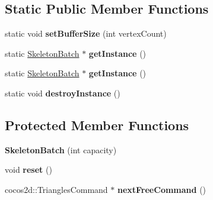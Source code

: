 \subsection*{Static Public Member Functions}
\begin{DoxyCompactItemize}
\item 
\mbox{\label{classspine_1_1SkeletonBatch_abc614238917d7c9c4f26a93323403d04}} 
static void {\bfseries set\+Buffer\+Size} (int vertex\+Count)
\item 
\mbox{\label{classspine_1_1SkeletonBatch_a436fdff286dd0313bbb278ca9eed6dbb}} 
static \hyperlink{classspine_1_1SkeletonBatch}{Skeleton\+Batch} $\ast$ {\bfseries get\+Instance} ()
\item 
\mbox{\label{classspine_1_1SkeletonBatch_af5eb2d714aedbf29cb65a82fabf2619d}} 
static \hyperlink{classspine_1_1SkeletonBatch}{Skeleton\+Batch} $\ast$ {\bfseries get\+Instance} ()
\item 
\mbox{\label{classspine_1_1SkeletonBatch_a518b2e4188c0f7bea266f1f37c0cf965}} 
static void {\bfseries destroy\+Instance} ()
\end{DoxyCompactItemize}
\subsection*{Protected Member Functions}
\begin{DoxyCompactItemize}
\item 
\mbox{\label{classspine_1_1SkeletonBatch_a8f5b874b108965e892790d6a475aa916}} 
{\bfseries Skeleton\+Batch} (int capacity)
\item 
\mbox{\label{classspine_1_1SkeletonBatch_a6ca135b02269a555a87483560eb0ccab}} 
void {\bfseries reset} ()
\item 
\mbox{\label{classspine_1_1SkeletonBatch_acdd144726c8ec540d47d0ebb0433614d}} 
cocos2d\+::\+Triangles\+Command $\ast$ {\bfseries next\+Free\+Command} ()
\end{DoxyCompactItemize}
